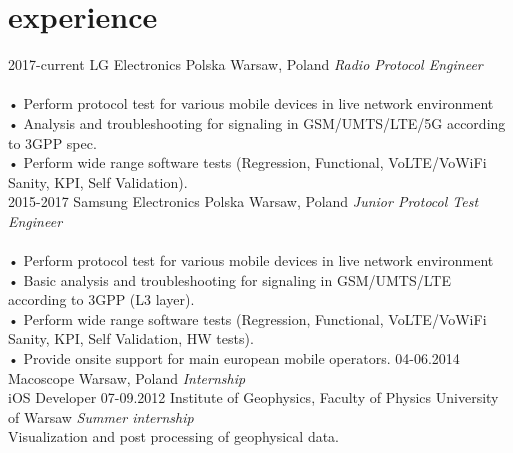 \documentclass[]{friggeri-cv} %
\begin{document}
\section{experience}

\begin{entrylist}
\entry
	{2017-current}
	{LG Electronics Polska}
	{Warsaw, Poland}
	{
		\emph{Radio Protocol Engineer} \\\\
		\footnotesize{
			• Perform protocol test for various mobile devices in live network environment\\
			• Analysis and troubleshooting for signaling in GSM/UMTS/LTE/5G according to 3GPP spec.\\
			• Perform wide range software tests (Regression, Functional, VoLTE/VoWiFi Sanity, KPI, Self Validation).\\
		}
	}
\entry
	{2015-2017}
	{Samsung Electronics Polska}
	{Warsaw, Poland}
	{
		\emph{Junior Protocol Test Engineer} \\\\
		\footnotesize{
			• Perform protocol test for various mobile devices in live network environment\\
			• Basic analysis and troubleshooting for signaling in GSM/UMTS/LTE according to 3GPP (L3 layer).\\
			• Perform wide range software tests (Regression, Functional, VoLTE/VoWiFi Sanity, KPI, Self Validation, HW tests).\\
			• Provide onsite support for main european mobile operators.
		}
	}
\entry
	{04-06.2014}
	{Macoscope}
	{Warsaw, Poland}
	{
		\emph{Internship} \\
		iOS Developer
	}
\entry
	{07-09.2012}
	{Institute of Geophysics, {\normalfont Faculty of Physics}}
	{University of Warsaw}
	{
		\emph{Summer internship} \\
		Visualization and post processing of geophysical data.	
	}
\end{entrylist}

%
\end{document}
